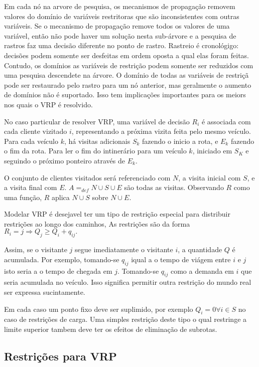 \documentclass[a4paper, 12pt]{article}
\begin{document}
 Em cada nó na arvore de pesquisa, os mecanismos de propagação removem valores do domínio de
variáveis restritoras que são inconsistentes com outras variáveis. Se o mecanismo de propagação
remove todos os valores de uma variável, então não pode haver um solução nesta sub-árvore e a
pesquisa de rastros faz uma decisão diferente no ponto de rastro. Rastreio é cronológigo: decisões
podem somente ser desfeitas em ordem oposta a qual elas foram feitas. Contudo, os domínios as
variáveis de restrição podem somente ser reduzidos com uma pesquisa descendete na árvore. O domínio
de todas as variáveis de restriçã pode ser restaurado pelo rastro para um nó anterior, mas
geralmente o aumento de domínios não é suportado. Isso tem implicações importantes para os meiors
nos quais o VRP é resolvido.

 No caso particular de resolver VRP, uma variável de decisão $R_i$ é associada com cada cliente
vizitado $i$, representando a próxima vizita feita pelo mesmo veículo. Para cada veículo $k$, há
visitas adicionais $S_k$ fazendo o inicio a rota, e $E_k$ fazendo o fim da rota. Para ler o fim do
intinerário para um veículo $k$, iniciado em $S_K$ e seguindo o próximo ponteiro através de $E_k$.

 O conjunto de clientes visitados será referenciado com $N$, a visita inicial com $S$, e a visita
final com $E$. $A =_{def} N\cup S\cup E$ são todas as visitas. Observando $R$ como uma função, $R$
aplica $N\cup S$ sobre $N\cup E$.

 Modelar VRP é desejavel ter um tipo de restrição especial para distribuir restrições ao longo dos
caminhos, As restrições são da forma $R_i = j \Rightarrow Q_j \geq Q_i + q_{ij}.$  

 Assim, se o visitante $j$ segue imediatamente o visitante $i$, a quantidade $Q$ é acumulada. Por
exemplo, tomando-se $q_{ij}$ iqual a o tempo de viágem entre $i$ e $j$ isto seria a o tempo de
chegada em $j$. Tomando-se $q_{ij}$ como a demanda em $i$ que seria acumulada no veículo. Isso
significa permitir outra restrição do mundo real ser expressa sucintamente.

 Em cada caso um ponto fixo deve ser suplimido, por exemplo $Q_i = 0 \forall i\in S$ no caso de
restrições de carga. Uma simples restrição deste tipo o qual restringe a limite superior tambem deve
ter os efeitos de eliminação de subrotas.

\subsection{Restrições para VRP}
\end{document}
